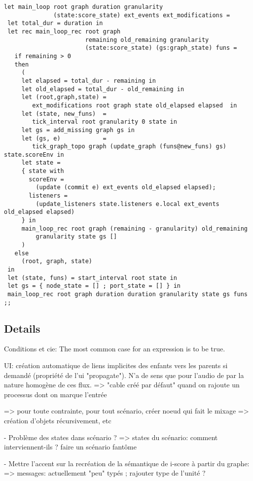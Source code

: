 \documentclass[applsci,article,submit,moreauthors,pdftex,10pt,a4paper]{mdpi}
\begin{document}
\begin{lstlisting}
let main_loop root graph duration granularity 
			  (state:score_state) ext_events ext_modifications =
 let total_dur = duration in
 let rec main_loop_rec root graph
                       remaining old_remaining granularity
                       (state:score_state) (gs:graph_state) funs =
   if remaining > 0
   then
     (
     let elapsed = total_dur - remaining in
     let old_elapsed = total_dur - old_remaining in
     let (root,graph,state) = 
     	ext_modifications root graph state old_elapsed elapsed  in
     let (state, new_funs)  = 
     	tick_interval root granularity 0 state in
     let gs = add_missing graph gs in
     let (gs, e)            = 
     	tick_graph_topo graph (update_graph (funs@new_funs) gs) state.scoreEnv in
     let state = 
     { state with
       scoreEnv = 
         (update (commit e) ext_events old_elapsed elapsed);
       listeners = 
         (update_listeners state.listeners e.local ext_events old_elapsed elapsed)
     } in
     main_loop_rec root graph (remaining - granularity) old_remaining
         granularity state gs []
     )
   else
     (root, graph, state)
 in
 let (state, funs) = start_interval root state in
 let gs = { node_state = [] ; port_state = [] } in
 main_loop_rec root graph duration duration granularity state gs funs
;;

\end{lstlisting}



\subsection{Details}

Conditions et cie: The most common case for an expression is to be true.

UI: création automatique de liens implicites des enfants vers les parents si demandé (propriété de l'ui "propagate").
N'a de sens que pour l'audio de par la nature homogène de ces flux.
=> "cable créé par défaut" quand on rajoute un processus dont on marque l'entrée

=> pour toute contrainte, pour tout scénario, créer noeud qui fait le mixage
=> création d'objets récursivement, etc

- Problème des states dans scénario ?
=> states du scénario: comment interviennent-ils ? faire un scénario fantôme 


- Mettre l'accent sur la recréation de la sémantique de i-score à partir du graphe: 
=> messages: actuellement "peu" typés ; rajouter type de l'unité ? 
\end{document}
